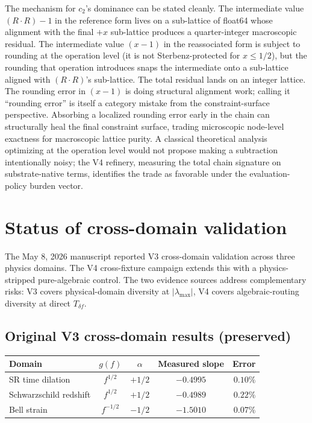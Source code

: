 \documentclass[11pt,a4paper]{article}
\begin{document}
The mechanism for $c_2$'s dominance can be stated cleanly. The intermediate value $(R \cdot R) - 1$ in the reference form lives on a sub-lattice of float64 whose alignment with the final $+ x$ sub-lattice produces a quarter-integer macroscopic residual. The intermediate value $(x - 1)$ in the reassociated form is subject to rounding at the operation level (it is not Sterbenz-protected for $x \le 1/2$), but the rounding that operation introduces snaps the intermediate onto a sub-lattice aligned with $(R \cdot R)$'s sub-lattice. The total residual lands on an integer lattice. The rounding error in $(x - 1)$ is doing structural alignment work; calling it ``rounding error'' is itself a category mistake from the constraint-surface perspective. Absorbing a localized rounding error early in the chain can structurally heal the final constraint surface, trading microscopic node-level exactness for macroscopic lattice purity. A classical theoretical analysis optimizing at the operation level would not propose making a subtraction intentionally noisy; the V4 refinery, measuring the total chain signature on substrate-native terms, identifies the trade as favorable under the evaluation-policy burden vector.

\section{Status of cross-domain validation}\label{sec:cross-domain}

The May 8, 2026 manuscript reported V3 cross-domain validation across three physics domains. The V4 cross-fixture campaign extends this with a physics-stripped pure-algebraic control. The two evidence sources address complementary risks: V3 covers physical-domain diversity at $|\lambda_{\max}|$, V4 covers algebraic-routing diversity at direct $T_{\delta f}$.

\subsection{Original V3 cross-domain results (preserved)}

\begin{center}
\begin{tabular}{lcccr}
\toprule
Domain & $g(f)$ & $\alpha$ & Measured slope & Error\\
\midrule
SR time dilation & $f^{1/2}$ & $+1/2$ & $-0.4995$ & $0.10\%$\\
Schwarzschild redshift & $f^{1/2}$ & $+1/2$ & $-0.4989$ & $0.22\%$\\
Bell strain & $f^{-1/2}$ & $-1/2$ & $-1.5010$ & $0.07\%$\\
\bottomrule
\end{tabular}
\end{center}
\end{document}
